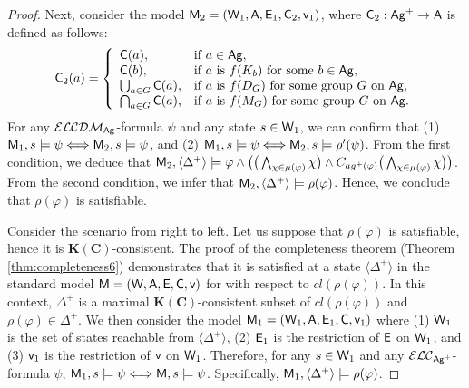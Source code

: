 \documentclass{article}
\newcommand{\ag}{\text{\normalfont\textsf{Ag}}\xspace}
\newcommand{\CA}{\textnormal{\sf A}\xspace}
\newcommand{\CC}{\textnormal{\sf C}\xspace}
\newcommand{\CE}{\textnormal{\sf E}\xspace}
\newcommand{\CM}{\textnormal{\sf M}\xspace}
\newcommand{\CV}{\textnormal{\sf v}\xspace}
\newcommand{\CW}{\textnormal{\sf W}\xspace}
\renewcommand{\phi}{\varphi}
\newcommand{\langc}{\ensuremath{\mathcal{ELC}}\xspace}
\newcommand{\langcdm}{\ensuremath{\mathcal{ELCDM}}\xspace}
\newcommand{\lc}{\text{\normalfont ELC}\xspace}
\newcommand{\KC}{\ensuremath{\mathbf{K(C)}}\xspace}
\begin{document}
\begin{proof}
Next, consider the model $\CM_2=(\CW_1,\CA,\CE_1,\CC_2,\CV_1)$, where $\CC_2:\ag^+\to\CA$ is defined as follows:
$$\CC_2(a) = \left\{\begin{array}{ll}
\CC(a), & \text{if $a\in\ag$},\\
\CC(b), & \text{if $a$ is $f(K_b)$ for some $b\in\ag$},\\
\bigcup_{a\in G} \CC(a), & \text{if $a$ is $f(D_G)$ for some group $G$ on $\ag$},\\
\bigcap_{a\in G} \CC(a), & \text{if $a$ is $f(M_G)$ for some group $G$ on $\ag$}.
\end{array}\right.$$
For any $\langcdm_\ag$-formula $\psi$ and any state $s\in\CW_1$, we can confirm that (1) $\CM_1,s\models \psi \Longleftrightarrow \CM_2,s\models \psi$, and (2) $\CM_1,s\models \psi \Longleftrightarrow \CM_2,s\models \rho'(\psi)$. From the first condition, we deduce that $\CM_2,\langle\Delta^+\rangle\models \phi \wedge \big(\big(\bigwedge_{\chi \in \mu(\phi)} \chi \big) \wedge C_{ag^+(\phi)} \big(\bigwedge_{\chi \in \mu(\phi)}\chi \big) \big)$. From the second condition, we infer that $\CM_2,\langle\Delta^+\rangle\models\rho(\phi)$. Hence, we conclude that $\rho(\phi)$ is satisfiable.

Consider the scenario from right to left. Let us suppose that $\rho(\phi)$ is satisfiable, hence it is \KC-consistent. The proof of the completeness theorem (Theorem \ref{thm:completeness6}) demonstrates that it is satisfied at a state $\langle\Delta^+\rangle$ in the standard model $\CM=(\CW,\CA,\CE,\CC,\CV)$ for \lc with respect to $cl(\rho(\phi))$. In this context, $\Delta^+$ is a maximal $\KC$-consistent subset of $cl(\rho(\phi))$ and $\rho(\phi) \in \Delta^+$. We then consider the model $\CM_1=(\CW_1,\CA,\CE_1,\CC,\CV_1)$ where (1) $\CW_1$ is the set of states reachable from $\langle\Delta^+\rangle$, 
(2) $\CE_1$ is the restriction of $\CE$ on $\CW_1$, and (3) $\CV_1$ is the restriction of $\CV$ on $\CW_1$.
Therefore, for any $s\in\CW_1$ and any $\langc_{\ag^+}$-formula $\psi$, $\CM_1,s\models\psi \Longleftrightarrow \CM,s\models\psi$. Specifically,  $\CM_1,\langle\Delta^+\rangle\models\rho(\phi)$.


\end{proof}
\end{document}
